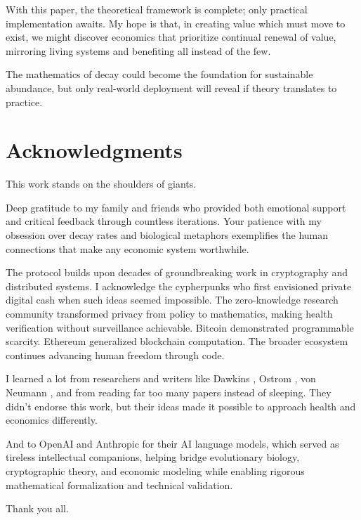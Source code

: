 \documentclass[11pt,letterpaper]{article}
\begin{document}
With this paper, the theoretical framework is complete; only practical implementation awaits. My hope is that, in creating value which must move to exist, we might discover economics that prioritize continual renewal of value, mirroring living systems and benefiting all instead of the few.

The mathematics of decay could become the foundation for sustainable abundance, but only real-world deployment will reveal if theory translates to practice.

\section{Acknowledgments}

This work stands on the shoulders of giants.

Deep gratitude to my family and friends who provided both emotional support and critical feedback through countless iterations. Your patience with my obsession over decay rates and biological metaphors exemplifies the human connections that make any economic system worthwhile.

The protocol builds upon decades of groundbreaking work in cryptography and distributed systems. I acknowledge the cypherpunks \cite{may1997crypto} who first envisioned private digital cash when such ideas seemed impossible. The zero-knowledge research community \cite{groth2016size} transformed privacy from policy to mathematics, making health verification without surveillance achievable. Bitcoin \cite{nakamoto2008bitcoin} demonstrated programmable scarcity. Ethereum \cite{buterin2014ethereum} generalized blockchain computation. The broader ecosystem continues advancing human freedom through code.

I learned a lot from researchers and writers like Dawkins \cite{dawkins1976selfish}, Ostrom \cite{ostrom1990governing}, von Neumann \cite{von1945first}, and from reading far too many papers instead of sleeping. They didn't endorse this work, but their ideas made it possible to approach health and economics differently.

And to OpenAI and Anthropic for their AI language models, which served as tireless intellectual companions, helping bridge evolutionary biology, cryptographic theory, and economic modeling while enabling rigorous mathematical formalization and technical validation.

Thank you all.

\clearpage
\end{document}
